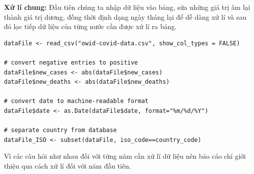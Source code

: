 \documentclass[a4paper]{article}
\theoremstyle{definition}
\begin{document}
\textbf{Xử lí chung:} Đầu tiên chúng ta nhập dữ liệu vào bảng, sửa những giá trị âm lại thành giá trị dương, đồng thời định dạng ngày tháng lại để dễ dàng xử lí và sau đó lọc tiếp dữ liệu của từng nước cần được xử lí ra bảng.
\begin{lstlisting}
dataFile <- read_csv("owid-covid-data.csv", show_col_types = FALSE)
  
# convert negative entries to positive
dataFile$new_cases <- abs(dataFile$new_cases)
dataFile$new_deaths <- abs(dataFile$new_deaths)

# convert date to machine-readable format
dataFile$date <- as.Date(dataFile$date, format="%m/%d/%Y")
  
# separate country from database
dataFile_ISO <- subset(dataFile, iso_code==country_code)
\end{lstlisting}
Vì các câu hỏi như nhau đối với từng năm cần xử lí dữ liệu nên báo cáo chỉ giới thiệu qua cách xử lí đối với năm đầu tiên.
\end{document}
